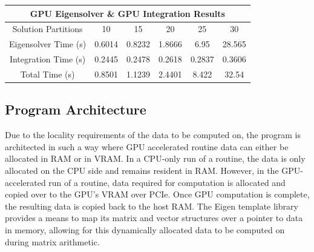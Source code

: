 \documentclass[conference, twoside]{IEEEtran}
\begin{document}
\begin{table}
\begin{tabular}{|c||c|c|c|c|c|}
        \hline
    \end{tabular}
    \begin{tabular}{|c||c|c|c|c|c|}
        \multicolumn{6}{c}{GPU Eigensolver \& GPU Integration Results} \\
        \hline
        {Solution Partitions} & {10} & {15} & {20} & {25} & {30} \\
        \hline
        \hline
        {Eigensolver Time (s)}              & {0.6014} & {0.8232} & {1.8666} & {6.95}   & {28.565}\\
        {Integration Time (s)}              & {0.2445} & {0.2478} & {0.2618} & {0.2837} & {0.3606}\\
        {Total Time (s)}                    & {0.8501} & {1.1239} & {2.4401} & {8.422}  & {32.54} \\
        \hline
    \end{tabular}
\end{table}

\subsection{Program Architecture} %

Due to the locality requirements of the data to be computed on, the program is architected in such a way where GPU accelerated routine data can either be allocated in RAM or in VRAM. In a CPU-only run of a routine, the data is only allocated on the CPU side and remains resident in RAM. However, in the GPU-accelerated run of a routine, data required for computation is allocated and copied over to the GPU's VRAM over PCIe. Once GPU computation is complete, the resulting data is copied back to the host RAM. The Eigen template library provides a means to map its matrix and vector structures over a pointer to data in memory, allowing for this dynamically allocated data to be computed on during matrix arithmetic.
\end{document}
